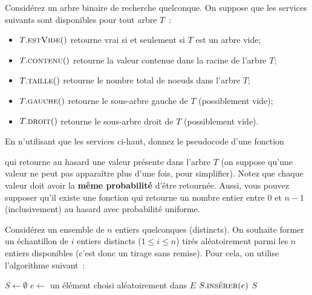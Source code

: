 \documentclass[12pt,addpoints]{exam}
\begin{document}
\begin{questions}
\question
Considérez un arbre binaire de recherche quelconque. On suppose que les services suivants sont disponibles pour tout arbre $T$~:
\begin{itemize}
  \item $T.\Call{estVide}$ retourne vrai si et seulement si $T$ est un arbre vide;
  \item $T.\Call{contenu}$ retourne la valeur contenue dans la racine de l'arbre $T$;
  \item $T.\Call{taille}$ retourne le nombre total de noeuds dans l'arbre $T$;
  \item $T.\Call{gauche}$ retourne le sous-arbre gauche de $T$ (possiblement vide);
  \item $T.\Call{droit}$ retourne le sous-arbre droit de $T$ (possiblement vide).
\end{itemize}
En n'utilisant que les services ci-haut, donnez le pseudocode d'une fonction
\begin{center}
\end{center}
qui retourne au hasard une valeur présente dans l'arbre $T$ (on suppose qu'une valeur ne peut pas apparaître plus d'une fois, pour simplifier). Notez que chaque valeur doit avoir la \textbf{même probabilité} d'être retournée. Aussi, vous pouvez supposer qu'il existe une fonction  qui retourne un nombre entier entre $0$ et $n - 1$ (inclusivement) au hasard avec probabilité uniforme.

\question
Considérez un ensemble de $n$ entiers quelconques (distincts). On souhaite former un échantillon de $i$ entiers distincts ($1 \leq i \leq n$) tirés aléatoirement parmi les $n$ entiers disponibles (c'est donc un tirage sans remise). Pour cela, on utilise l'algorithme suivant~:
\begin{algorithmic}[1]
    \State $S \gets \emptyset$
      \State $e \gets $ un élément choisi aléatoirement dans $E$
        \State $S.\Call{insérer}{e}$
      \EndIf
    \EndWhile
    \State \Return $S$
  \EndFunction
\end{algorithmic}
\end{questions}
\end{document}
